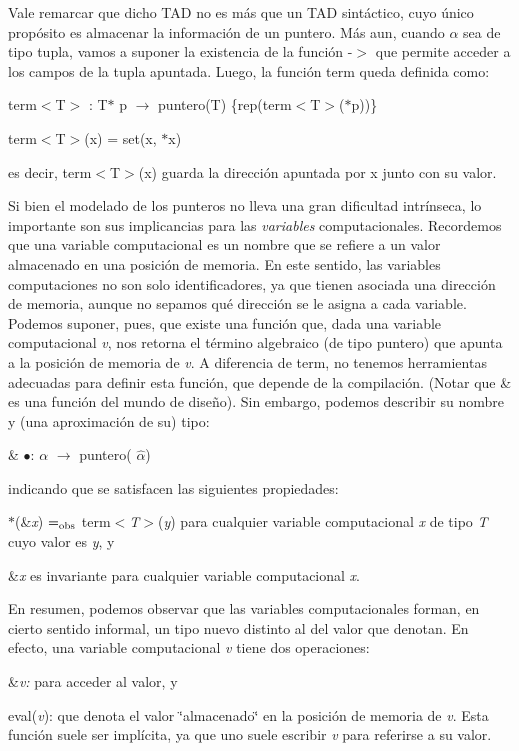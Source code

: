 Vale remarcar que dicho T\-A\-D no es más que un T\-A\-D sintáctico, cuyo único propósito es almacenar la información de un puntero. Más aun, cuando $\alpha$ sea de tipo tupla, vamos a suponer la existencia de la función -\/$>$ que permite acceder a los campos de la tupla apuntada. Luego, la función term queda definida como\-:
\begin{DoxyItemize}
\item term$<$\-T$>$ \-: T$\ast$ p $\to$ puntero(\-T) \{rep(term$<$\-T$>$($\ast$p))\}
\item term$<$\-T$>$(x) = set(x, $\ast$x)
\end{DoxyItemize}

es decir, term$<$\-T$>$(x) guarda la dirección apuntada por x junto con su valor.

Si bien el modelado de los punteros no lleva una gran dificultad intrínseca, lo importante son sus implicancias para las {\itshape variables} computacionales. Recordemos que una variable computacional es un nombre que se refiere a un valor almacenado en una posición de memoria. En este sentido, las variables computaciones no son solo identificadores, ya que tienen asociada una dirección de memoria, aunque no sepamos qué dirección se le asigna a cada variable. Podemos suponer, pues, que existe una función que, dada una variable computacional {\itshape v}, nos retorna el término algebraico (de tipo puntero) que apunta a la posición de memoria de {\itshape v}. A diferencia de term, no tenemos herramientas adecuadas para definir esta función, que depende de la compilación. (Notar que \& es una función del mundo de diseño). Sin embargo, podemos describir su nombre y (una aproximación de su) tipo\-:
\begin{DoxyItemize}
\item \& $\bullet$\-: $\alpha$ $\to$ puntero( $\widehat{\alpha}$)
\end{DoxyItemize}

indicando que se satisfacen las siguientes propiedades\-:
\begin{DoxyEnumerate}
\item $\ast$(\&{\itshape x}) $=_{\rm obs}$ term$<${\itshape T$>$}({\itshape y}) para cualquier variable computacional {\itshape x} de tipo {\itshape T} cuyo valor es {\itshape y}, y
\item \&{\itshape x} es invariante para cualquier variable computacional {\itshape x}.
\end{DoxyEnumerate}

En resumen, podemos observar que las variables computacionales forman, en cierto sentido informal, un tipo nuevo distinto al del valor que denotan. En efecto, una variable computacional {\itshape v} tiene dos operaciones\-:
\begin{DoxyEnumerate}
\item \&{\itshape v\-:} para acceder al valor, y
\item eval({\itshape v})\-: que denota el valor \char`\"{}almacenado\char`\"{} en la posición de memoria de {\itshape v}. Esta función suele ser implícita, ya que uno suele escribir {\itshape v} para referirse a su valor.
\end{DoxyEnumerate}

